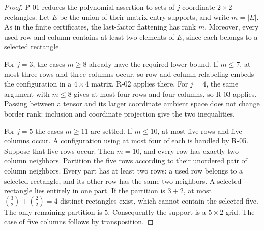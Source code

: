 \begin{proof}
P-01 reduces the polynomial assertion to sets of $j$
coordinate $2\times2$ rectangles. Let $E$ be the union of
their matrix-entry supports, and write $m=|E|$. As in the
finite certificates, the last-factor flattening has rank
$m$. Moreover, every used row and column contains at least
two elements of $E$, since each belongs to a selected
rectangle.

For $j=3$, the cases $m\geq8$ already have the required
lower bound. If $m\leq7$, at most three rows and three
columns occur, so row and column relabeling embeds the
configuration in a $4\times4$ matrix. R-02 applies there.
For $j=4$, the same argument with $m\leq8$ gives at most
four rows and four columns, so R-03 applies. Passing
between a tensor and its larger coordinate ambient space
does not change border rank: inclusion and coordinate
projection give the two inequalities.

For $j=5$ the cases $m\geq11$ are settled. If $m\leq10$,
at most five rows and five columns occur. A configuration
using at most four of each is handled by R-05. Suppose
that five rows occur. Then $m=10$, and every row has
exactly two column neighbors. Partition the five rows
according to their unordered pair of column neighbors.
Every part has at least two rows: a used row belongs to
a selected rectangle, and its other row has the same
two neighbors. A selected rectangle lies entirely in
one part. If the partition is $3+2$, at most
$\binom32+\binom22=4$ distinct rectangles exist, which
cannot contain the selected five. The only remaining
partition is $5$. Consequently the support is a
$5\times2$ grid. The case of five columns follows by
transposition.


\end{proof}

